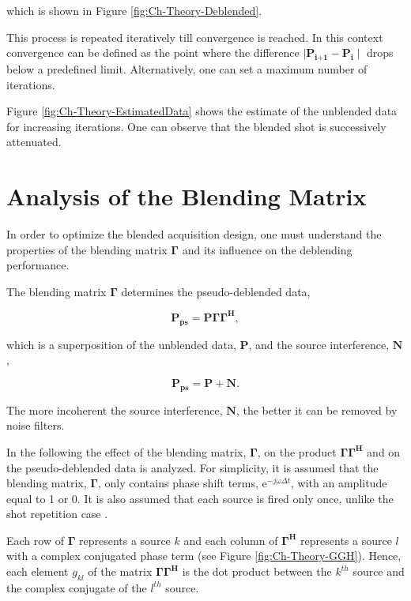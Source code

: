 which is shown in Figure \ref{fig:Ch-Theory-Deblended}.

This process is repeated iteratively till convergence is reached. In this context convergence can be defined as the point where the difference $\mid \textbf{\^P}_\textbf{i+1} - \textbf{\^{P}}_\textbf{i} \mid$ drops below a predefined limit. Alternatively, one can set a maximum number of iterations. 

Figure \ref{fig:Ch-Theory-EstimatedData} shows the estimate of the unblended data for increasing iterations. One can observe that the blended shot is successively  attenuated.



\section{Analysis of the Blending Matrix} \label{sec:BlendingMatrix}

In order to optimize the blended acquisition design, one must understand the properties of the blending matrix $\mathbf{\Gamma}$ and its influence on the deblending performance.

The blending matrix $\mathbf{\Gamma}$ determines the pseudo-deblended data,

\begin{equation}
	\mathbf{ P_{ps} } = \mathbf{P \Gamma \Gamma ^H},
	\label{eq:Ch-Theory-Pseudo-Deblended-Data}
\end{equation}

which is a superposition of the unblended data, $\mathbf{P}$, and the source interference, $\mathbf{N}$,

\begin{equation}
	\mathbf{P_{ps}} = \mathbf{P} + \mathbf{N}.
	\label{eq:Ch-Theory-PseudoSuperposition}
\end{equation}

The more incoherent the source interference, $\mathbf{N}$, the better it can be removed by noise filters.

In the following the effect of the blending matrix, $\mathbf{\Gamma}$, on the product $\mathbf{\Gamma \Gamma^H}$ and on the pseudo-deblended data is analyzed. For simplicity, it is assumed that the blending matrix, $\mathbf{\Gamma}$, only contains phase shift terms, $\mathrm{e}^{-j \omega \Delta t}$, with an amplitude equal to 1 or 0. It is also assumed that each source is fired only once, unlike the shot repetition case \citep{Sixue}.

Each row of $\mathbf{\Gamma}$ represents a source $k$ and each column of $\mathbf{\Gamma ^H}$ represents a source $l$ with a complex conjugated phase term (see Figure \ref{fig:Ch-Theory-GGH}). Hence, each element $g_{kl}$ of the matrix $\mathbf{\Gamma \Gamma^H}$ is the dot product between the $k^{th}$ source and the complex conjugate of the $l^{th}$ source.

